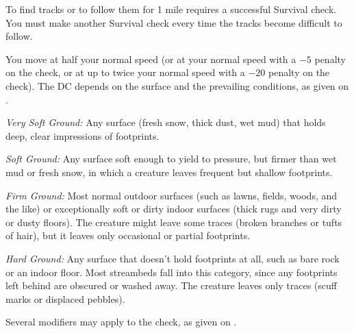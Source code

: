 {}{}
{To find tracks or to follow them for 1 mile requires a successful Survival check. You must make another Survival check every time the tracks become difficult to follow.

You move at half your normal speed (or at your normal speed with a $-5$ penalty on the check, or at up to twice your normal speed with a $-20$ penalty on the check). The DC depends on the surface and the prevailing conditions, as given on .



\textit{Very Soft Ground:} Any surface (fresh snow, thick dust, wet mud) that holds deep, clear impressions of footprints.

\textit{Soft Ground:} Any surface soft enough to yield to pressure, but firmer than wet mud or fresh snow, in which a creature leaves frequent but shallow footprints.

\textit{Firm Ground:} Most normal outdoor surfaces (such as lawns, fields, woods, and the like) or exceptionally soft or dirty indoor surfaces (thick rugs and very dirty or dusty floors). The creature might leave some traces (broken branches or tufts of hair), but it leaves only occasional or partial footprints.

\textit{Hard Ground:} Any surface that doesn't hold footprints at all, such as bare rock or an indoor floor. Most streambeds fall into this category, since any footprints left behind are obscured or washed away. The creature leaves only traces (scuff marks or displaced pebbles).

Several modifiers may apply to the  check, as given on .

}
